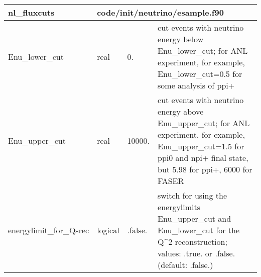 \documentclass{article}
\begin{document}
\begin{longtable}{llll}
\toprule
\textbf{\large{nl\_fluxcuts}} & \multicolumn{3}{l}{\footnotesize{code/init/neutrino/esample.f90}}\\*
\midrule
\endfirsthead
\midrule
\endhead
Enu\_lower\_cut & \begin{minipage}[t]{2cm}real\end{minipage} & \begin{minipage}[t]{2cm}0.\end{minipage} & \begin{minipage}[t]{12cm}cut events with neutrino energy below Enu\_lower\_cut; for ANL experiment, for example, Enu\_lower\_cut=0.5 for some analysis of ppi+\end{minipage}\\*
\midrule
Enu\_upper\_cut & \begin{minipage}[t]{2cm}real\end{minipage} & \begin{minipage}[t]{2cm}10000.\end{minipage} & \begin{minipage}[t]{12cm}cut events with neutrino energy above Enu\_upper\_cut; for ANL experiment, for example, Enu\_upper\_cut=1.5 for ppi0 and npi+ final state, but 5.98 for ppi+, 6000 for FASER\end{minipage}\\*
\midrule
energylimit\_for\_Qsrec & \begin{minipage}[t]{2cm}logical\end{minipage} & \begin{minipage}[t]{2cm}.false.\end{minipage} & \begin{minipage}[t]{12cm}switch for using the energylimits Enu\_upper\_cut and Enu\_lower\_cut for the Q\^{}2 reconstruction; values: .true. or .false.  (default: .false.)\end{minipage}\\*
\bottomrule
\end{longtable}
{ }



\end{document}
